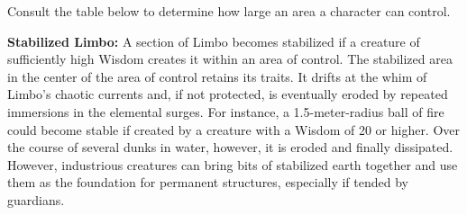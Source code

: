 Consult the table below to determine how large an area a character can control.


\textbf{Stabilized Limbo:} A section of Limbo becomes stabilized if a creature of sufficiently high Wisdom creates it within an area of control. The stabilized area in the center of the area of control retains its traits. It drifts at the whim of Limbo's chaotic currents and, if not protected, is eventually eroded by repeated immersions in the elemental surges. For instance, a 1.5-meter-radius ball of fire could become stable if created by a creature with a Wisdom of 20 or higher. Over the course of several dunks in water, however, it is eroded and finally dissipated. However, industrious creatures can bring bits of stabilized earth together and use them as the foundation for permanent structures, especially if tended by guardians.

